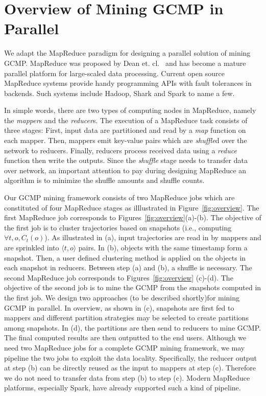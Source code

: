 \section{Overview of Mining GCMP in Parallel}
\label{sec:system_overview}
We adapt the MapReduce paradigm for designing
a parallel solution of mining GCMP. 
MapReduce was proposed by Dean et. cl.~\cite{dean2008mapreduce}
and has become a mature parallel platform for large-scaled data processing. 
Current open source MapReduce systems provide handy programming APIs with fault tolerances
in backends. Such systems include Hadoop, Shark and Spark to name a few.

In simple words, there are two types of computing nodes in MapReduce,
namely the \emph{mapper}s and the \emph{reducer}s. The execution of a MapReduce task consists of
three stages: First, input data
are partitioned and read by a \emph{map} function on each mapper. Then, mappers
emit key-value pairs which are \emph{shuffle}d over the network to reducers. Finally,
reducers process received data using a \emph{reduce} function then write the
outputs.
Since the \emph{shuffle} stage needs to transfer data over network, 
an important attention to pay during designing MapReduce an algorithm is 
to minimize the shuffle amounts and shuffle counts. 

Our GCMP mining framework consists of two MapReduce jobs which
are constituted of four MapReduce stages as illlustrated in Figure~\ref{fig:overview}.
The first MapReduce job corresponds to Figures~\ref{fig:overview}(a)-(b). The objective
of the first job is to cluster trajectories based on snapshots (i.e., computing $\forall t, o, C_t(o)$).
As illustrated in (a), input trajectories are read in by mappers 
and are sprinkled into $\langle t,o \rangle$ pairs. In (b), objects with the same timestamp
form a snapshot. Then, a user defined clustering method is applied on the objects
in each snapshot in reducers. Between step (a) and (b), a shuffle is necessary. The second
MapReduce job corresponds to Figures~\ref{fig:overview} (c)-(d). The objective 
of the second job is to mine the GCMP from the snapshots computed in the first job. We design
two approaches (to be described shortly)for mining GCMP in parallel. In overview, as shown in (c), snapshots
are first fed to mappers and different partition strategies may be selected to create
partitions among snapshots. In (d), the partitions are then send to reducers to mine GCMP.
The final computed results are then outputted to the end users. Although we need two MapReduce
jobs for a complete GCMP mining framework, we may pipeline the two jobs to exploit the data locality.
Specifically, the reducer output at step (b) can be directly reused as the input to mappers at step (c). Therefore
we do not need to transfer data from step (b) to step (c). Modern MapReduce platforms, especially Spark, have
already supported such a kind of pipeline.

